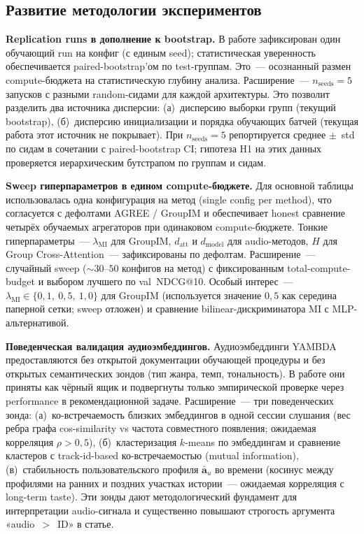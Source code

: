 \subsection{Развитие методологии экспериментов}\label{subsec:ch3:lim-methodology-eval}

\textbf{Replication runs в дополнение к bootstrap.} В работе зафиксирован один обучающий run на конфиг (с единым seed); статистическая уверенность обеспечивается paired-bootstrap'ом по test-группам. Это~--- осознанный размен compute-бюджета на статистическую глубину анализа. Расширение~--- $n_{\mathrm{seeds}} = 5$ запусков с разными random-сидами для каждой архитектуры. Это позволит разделить два источника дисперсии: (а)~дисперсию выборки групп (текущий bootstrap), (б)~дисперсию инициализации и порядка обучающих батчей (текущая работа этот источник не покрывает). При $n_{\mathrm{seeds}} = 5$ репортируется среднее $\pm$~std по сидам в сочетании с paired-bootstrap CI; гипотеза H1 на этих данных проверяется иерархическим бутстрапом по группам и сидам.

\textbf{Sweep гиперпараметров в едином compute-бюджете.} Для основной таблицы использовалась одна конфигурация на метод (single config per method), что согласуется с дефолтами AGREE / GroupIM и обеспечивает honest сравнение четырёх обучаемых агрегаторов при одинаковом compute-бюджете. Тонкие гиперпараметры~--- $\lambda_{\mathrm{MI}}$ для GroupIM, $d_{\mathrm{att}}$ и $d_{\mathrm{model}}$ для audio-методов, $H$ для Group Cross-Attention~--- зафиксированы по дефолтам. Расширение~--- случайный sweep ($\sim$$30$--$50$ конфигов на метод) с фиксированным total-compute-budget и выбором лучшего по val~NDCG@10. Особый интерес~--- $\lambda_{\mathrm{MI}} \in \{0{,}1,\ 0{,}5,\ 1{,}0\}$ для GroupIM (используется значение $0{,}5$ как середина паперной сетки; sweep отложен) и сравнение bilinear-дискриминатора MI с MLP-альтернативой.

\textbf{Поведенческая валидация аудиоэмбеддингов.} Аудиоэмбеддинги YAMBDA предоставляются без открытой документации обучающей процедуры и без открытых семантических зондов (тип жанра, темп, тональность). В работе они приняты как чёрный ящик и подвергнуты только эмпирической проверке через performance в рекомендационной задаче. Расширение~--- три поведенческих зонда: (а)~ко-встречаемость близких эмбеддингов в одной сессии слушания (вес ребра графа cos-similarity vs частота совместного появления; ожидаемая корреляция $\rho > 0{,}5$), (б)~кластеризация $k$-means по эмбеддингам и сравнение кластеров с track-id-based ко-встречаемостью (mutual information), (в)~стабильность пользовательского профиля $\bar{\mathbf{a}}_u$ во времени (косинус между профилями на ранних и поздних участках истории~--- ожидаемая корреляция с long-term taste). Эти зонды дают методологический фундамент для интерпретации audio-сигнала и существенно повышают строгость аргумента «audio~$>$~ID» в статье.

